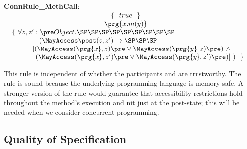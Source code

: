 \noindent
 \textbf{ConnRule\_MethCall}:\\
$\begin{array}{c}
\{ \ \ true\ \  \}\\ 
\prg{x.m(y)} \\  
 \{\  \forall z,z': \pre Object.  \SP \SP \SP  \SP \SP \SP  \SP \SP \SP  ~~~~~~~~~~~~~~~~~~~~~~~~~~~~ \\
 ( \MayAccess\post(z,z') \rightarrow  \SP \SP \SP  ~~~~~~~~~~~~~~~~~~~~~~~~  \\
 ~~~~~ [(\MayAccess(\prg{x},z)\pre \vee \MayAccess(\prg{y},z)\pre) \ \wedge\\
 ~~~~~~ ~~~ ~  \ \ (\MayAccess(\prg{x},z')\pre \vee \MayAccess(\prg{y},z')\pre ) ]  \ )  \ \ \}
 \end{array}$
\sd{Similar rules exist for field and variable assignment, but we omit
  them here. 
}

 This rule is independent of whether the participants  and  are trustworthy. The rule is sound because the underlying programming language is memory safe. A stronger version of the rule would guarantee that accessibility restrictions hold throughout the method's execution and nit just at the post-state; this will be needed  when we consider concurrent programming.
%



\subsection*{Quality of Specification} 


